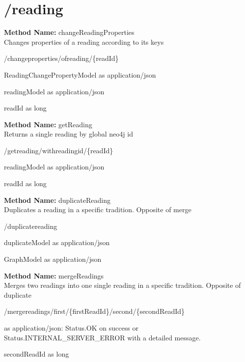 \section{/reading}
\textbf{Method Name: }changeReadingProperties \\ Changes properties of a reading according to its keys
\begin{post}
/changeproperties/ofreading/\{readId\}
\end{post}
\begin{request}
 ReadingChangePropertyModel as application/json
\end{request}
\begin{response}
readingModel as application/json
\end{response}
\begin{parameter}
readId as long
\end{parameter}
\textbf{Method Name: }getReading \\ Returns a single reading by global neo4j id
\begin{get}
/getreading/withreadingid/\{readId\}
\end{get}
\begin{response}
readingModel as application/json
\end{response}
\begin{parameter}
readId as long
\end{parameter}
\textbf{Method Name: }duplicateReading \\ Duplicates a reading in a specific tradition. Opposite of merge
\begin{post}
/duplicatereading
\end{post}
\begin{request}
duplicateModel as application/json
\end{request}
\begin{response}
GraphModel as application/json
\end{response}
\textbf{Method Name: }mergeReadings \\ Merges two readings into one single reading in a specific tradition. Opposite of duplicate
\begin{post}
/mergereadings/first/\{firstReadId\}/second/\{secondReadId\}
\end{post}
\begin{response}
 as application/json: Status.OK on success or Status.INTERNAL\_SERVER\_ERROR with a detailed message.
\end{response}
\begin{parameter}
secondReadId as long
\end{parameter}
